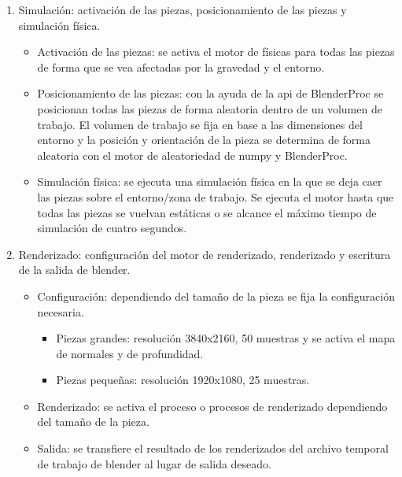 \begin{enumerate}
\item Simulación: activación de las piezas, posicionamiento de las piezas y simulación física.
\begin{itemize}
\item Activación de las piezas: se activa el motor de físicas para todas las piezas de forma que se vea afectadas por la gravedad y el entorno.
\item Posicionamiento de las piezas: con la ayuda de la \acs{api} de BlenderProc se posicionan todas las piezas de forma aleatoria dentro de un volumen de trabajo. El volumen de trabajo se fija en base a las dimensiones del entorno y la posición y orientación de la pieza se determina de forma aleatoria con el motor de aleatoriedad de numpy y BlenderProc.
\item Simulación física: se ejecuta una simulación física en la que se deja caer las piezas sobre el entorno/zona de trabajo. Se ejecuta el motor hasta que todas las piezas se vuelvan estáticas o se alcance el máximo tiempo de simulación de cuatro segundos.
\end{itemize}

\item Renderizado: configuración del motor de renderizado, renderizado y escritura de la salida de blender.
\begin{itemize}
\item Configuración: dependiendo del tamaño de la pieza se fija la configuración necesaria.
\begin{itemize}
\item Piezas grandes: resolución 3840x2160, 50 muestras y se activa el mapa de normales y de profundidad.
\item Piezas pequeñas: resolución 1920x1080, 25 muestras.
\end{itemize}
\item Renderizado: se activa el proceso o procesos de renderizado dependiendo del tamaño de la pieza.
\item Salida: se transfiere el resultado de los renderizados del archivo temporal de trabajo de blender al lugar de salida deseado.
\end{itemize}
\end{enumerate}

